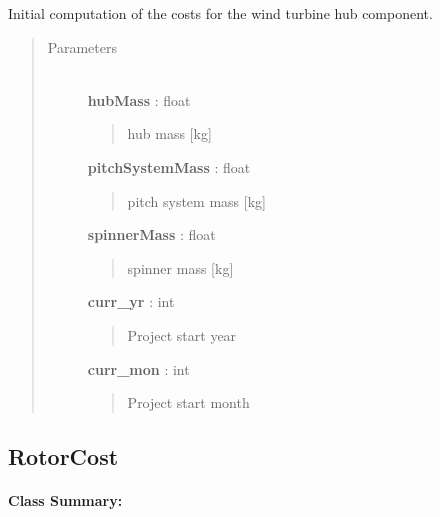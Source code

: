 \documentclass[letterpaper,10pt,openany,oneside]{sphinxmanual}
\begin{document}
\begin{fulllineitems}
\label{documentation:turbine_costSE.src.rotor_costsSE.HubSystemCost}
Initial computation of the costs for the wind turbine hub component.
\begin{quote}\begin{description}
\item[{Parameters }] \leavevmode\\
\textbf{hubMass} : float
\begin{quote}

hub mass {[}kg{]}
\end{quote}

\textbf{pitchSystemMass} : float
\begin{quote}

pitch system mass {[}kg{]}
\end{quote}

\textbf{spinnerMass} : float
\begin{quote}

spinner mass {[}kg{]}
\end{quote}

\textbf{curr\_yr} : int
\begin{quote}

Project start year
\end{quote}

\textbf{curr\_mon} : int
\begin{quote}

Project start month
\end{quote}

\end{description}\end{quote}

\end{fulllineitems}



\subsection{RotorCost}
\label{documentation:rotorcost}\label{documentation:rotorcost-class-label}\paragraph{Class Summary:}
\end{document}
